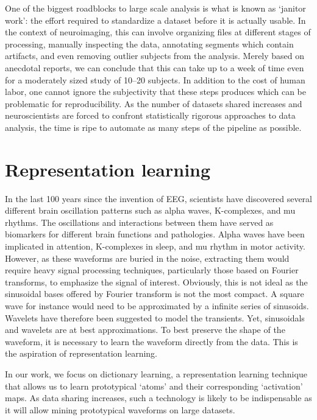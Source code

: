 One of the biggest roadblocks to large scale analysis is what is known as `janitor work': the effort required to standardize a dataset before it is actually usable. In the context of neuroimaging, this can involve organizing files at different stages of processing, manually inspecting the data, annotating segments which contain artifacts, and even removing outlier subjects from the analysis. Merely based on anecdotal reports, we can conclude that this can take up to a week of time even for a moderately sized study of 10--20 subjects.
In addition to the cost of human labor, one cannot ignore the subjectivity that these steps produces which can be problematic for reproducibility. As the number of datasets shared increases and neuroscientists are forced to confront statistically rigorous approaches to data analysis, the time is ripe to automate as many steps of the pipeline as possible.

\section{Representation learning}
In the last 100 years since the invention of EEG, scientists have discovered several different brain oscillation patterns such as alpha waves, K-complexes, and mu rhythms. The oscillations and interactions between them have served as biomarkers for different brain functions and pathologies. Alpha waves have been implicated in attention, K-complexes in sleep, and mu rhythm in motor activity. However, as these waveforms are buried in the noise, extracting them would require heavy signal processing techniques, particularly those based on Fourier transforms, to emphasize the signal of interest. Obviously, this is not ideal as the sinusoidal bases offered by Fourier transform is not the most compact. A square wave for instance would need to be approximated by a infinite series of sinusoids. Wavelets have therefore been suggested to model the transients. Yet, sinusoidals and wavelets are at best approximations. To best preserve the shape of the waveform, it is necessary to learn the waveform directly from the data. This is the aspiration of representation learning.

In our work, we focus on dictionary learning, a representation learning technique that allows us to learn prototypical `atoms' and their corresponding `activation' maps. As data sharing increases, such a technology is likely to be indispensable as it will allow mining prototypical waveforms on large datasets.

